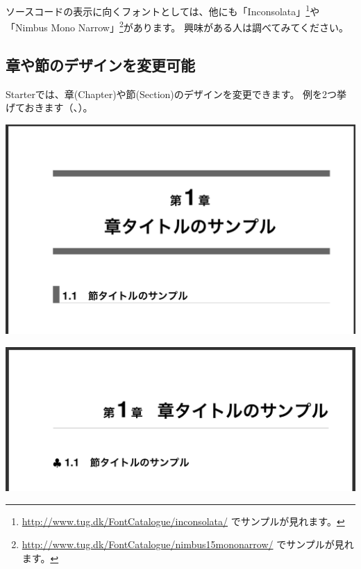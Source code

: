 ソースコードの表示に向くフォントとしては、他にも「Inconsolata」\footnote{\url{http://www.tug.dk/FontCatalogue/inconsolata/} でサンプルが見れます。}や「Nimbus Mono Narrow」\footnote{\url{http://www.tug.dk/FontCatalogue/nimbus15mononarrow/} でサンプルが見れます。}があります。
興味がある人は調べてみてください。

\subsection*{章や節のデザインを変更可能}
\label{sec:1-2-8}

Starterでは、章(Chapter)や節(Section)のデザインを変更できます。
例を2つ挙げておきます（、）。

\begin{reviewimage}%
\includegraphics[width=0.7\maxwidth]{./images/chap01-starter/chaphead_design_3.png}%
\label{image:chap01-starter:chaphead_design_3}
\end{reviewimage}
\begin{reviewimage}%
\includegraphics[width=0.7\maxwidth]{./images/chap01-starter/chaphead_design_2.png}%
\label{image:chap01-starter:chaphead_design_2}
\end{reviewimage}

